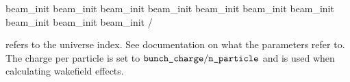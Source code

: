 {{{{{{{{{{{{{\begin{example}
    beam_init%
    beam_init%
    beam_init%
    beam_init%
    beam_init%
    beam_init%
    beam_init%
    beam_init%
    beam_init%
    beam_init%
  /
\end{example}
 refers to the universe index. See \bmad documentation on what
the  parameters refer to. The charge per particle is set to
$\vn{bunch_charge} / \vn{n_particle}$ and is used when calculating wakefield
effects.

\vn{%
construct the beam's particle distribution. If not set then the emittances set in
the lattice file are used. These emittances are also used as the initial emittance
in a linear lattice for the emittance calculation using the radiation integrals.

}}}}}}}}}}}}}}
